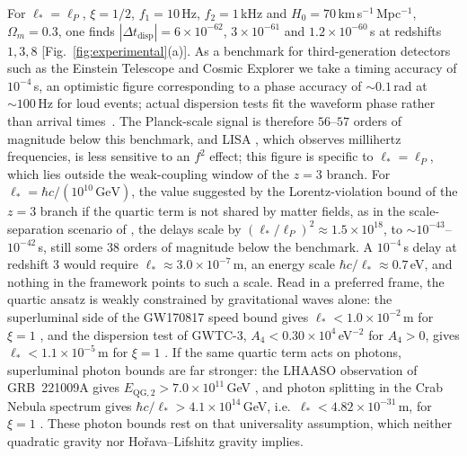\documentclass[aps,prl,reprint,twocolumn,superscriptaddress,nofootinbib,floatfix]{revtex4-2}
\begin{document}
For $\ell_\ast = \ell_P$, $\xi = 1/2$, $f_1 = 10$\,Hz, $f_2 = 1$\,kHz and $H_0 = 70$\,km\,s$^{-1}$\,Mpc$^{-1}$, $\Omega_m = 0.3$, one finds $|\Delta t_{\mathrm{disp}}| = 6 \times 10^{-62}$, $3 \times 10^{-61}$ and $1.2 \times 10^{-60}$\,s at redshifts $1, 3, 8$ [Fig.~\ref{fig:experimental}(a)]. As a benchmark for third-generation detectors such as the Einstein Telescope \cite{punturo2010einstein} and Cosmic Explorer \cite{reitze2019cosmic} we take a timing accuracy of $10^{-4}$\,s, an optimistic figure corresponding to a phase accuracy of $\sim 0.1$\,rad at $\sim 100$\,Hz for loud events; actual dispersion tests fit the waveform phase rather than arrival times~\cite{ligo2019tgr}. The Planck-scale signal is therefore $56$--$57$ orders of magnitude below this benchmark, and LISA \cite{amaro2017laser}, which observes millihertz frequencies, is less sensitive to an $f^2$ effect; this figure is specific to $\ell_\ast = \ell_P$, which lies outside the weak-coupling window of the $z = 3$ branch. For $\ell_\ast = \hbar c/(10^{10}\,\mathrm{GeV})$, the value suggested by the Lorentz-violation bound of the $z = 3$ branch if the quartic term is not shared by matter fields, as in the scale-separation scenario of \cite{pospelov2012lorentz}, the delays scale by $(\ell_\ast/\ell_P)^2 \approx 1.5 \times 10^{18}$, to $\sim 10^{-43}$--$10^{-42}$\,s, still some $38$ orders of magnitude below the benchmark. A $10^{-4}$\,s delay at redshift $3$ would require $\ell_\ast \approx 3.0 \times 10^{-7}$\,m, an energy scale $\hbar c/\ell_\ast \approx 0.7$\,eV, and nothing in the framework points to such a scale. Read in a preferred frame, the quartic ansatz is weakly constrained by gravitational waves alone: the superluminal side of the GW170817 speed bound gives $\ell_\ast < 1.0 \times 10^{-2}$\,m for $\xi = 1$ \cite{abbott2017gw170817}, and the dispersion test of GWTC-3, $A_4 < 0.30 \times 10^4$\,eV$^{-2}$ for $A_4 > 0$, gives $\ell_\ast < 1.1 \times 10^{-5}$\,m for $\xi = 1$ \cite{gwtc3tgr}. If the same quartic term acts on photons, superluminal photon bounds are far stronger: the LHAASO observation of GRB~221009A gives $E_{\mathrm{QG},2} > 7.0 \times 10^{11}$\,GeV \cite{lhaaso2024}, and photon splitting in the Crab Nebula spectrum gives $\hbar c/\ell_\ast > 4.1 \times 10^{14}$\,GeV, i.e.\ $\ell_\ast < 4.82 \times 10^{-31}$\,m, for $\xi = 1$ \cite{satunin2019}. These photon bounds rest on that universality assumption, which neither quadratic gravity nor Ho\v{r}ava--Lifshitz gravity implies.
\end{document}
